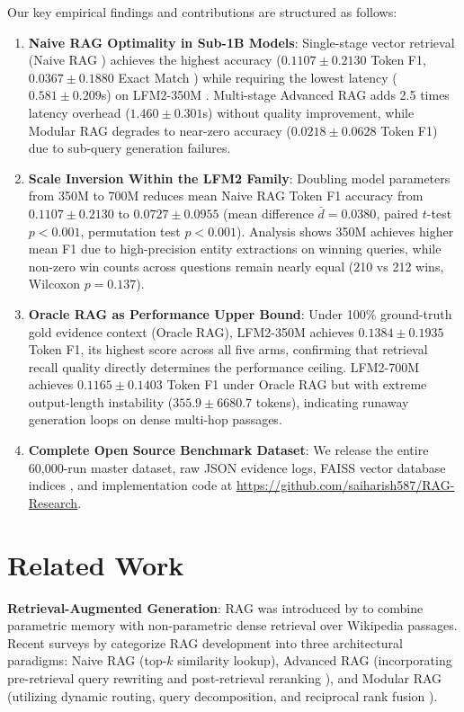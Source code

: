 \documentclass[conference]{IEEEtran}
\begin{document}
Our key empirical findings and contributions are structured as follows:
\begin{enumerate}
    \item \textbf{Naive RAG Optimality in Sub-1B Models}: Single-stage vector retrieval (Naive RAG \cite{lewis2020retrieval}) achieves the highest accuracy ($0.1107 \pm 0.2130$ Token F1, $0.0367 \pm 0.1880$ Exact Match \cite{rajpurkar2016squad}) while requiring the lowest latency ($0.581 \pm 0.209$s) on LFM2-350M \cite{liquid2024lfm}. Multi-stage Advanced RAG adds 2.5 times latency overhead ($1.460 \pm 0.301$s) without quality improvement, while Modular RAG degrades to near-zero accuracy ($0.0218 \pm 0.0628$ Token F1) due to sub-query generation failures.
    \item \textbf{Scale Inversion Within the LFM2 Family}: Doubling model parameters from 350M to 700M reduces mean Naive RAG Token F1 accuracy from $0.1107 \pm 0.2130$ to $0.0727 \pm 0.0955$ (mean difference $\bar{d}=0.0380$, paired $t$-test $p < 0.001$, permutation test $p < 0.001$). Analysis shows 350M achieves higher mean F1 due to high-precision entity extractions on winning queries, while non-zero win counts across questions remain nearly equal (210 vs 212 wins, Wilcoxon $p=0.137$).
    \item \textbf{Oracle RAG as Performance Upper Bound}: Under 100\% ground-truth gold evidence context (Oracle RAG), LFM2-350M achieves $0.1384 \pm 0.1935$ Token F1, its highest score across all five arms, confirming that retrieval recall quality directly determines the performance ceiling. LFM2-700M achieves $0.1165 \pm 0.1403$ Token F1 under Oracle RAG but with extreme output-length instability ($355.9 \pm 6680.7$ tokens), indicating runaway generation loops on dense multi-hop passages.
    \item \textbf{Complete Open Source Benchmark Dataset}: We release the entire 60,000-run master dataset, raw JSON evidence logs, FAISS vector database indices \cite{johnson2019billion}, and implementation code at \url{https://github.com/saiharish587/RAG-Research}.
\end{enumerate}

\section{Related Work}
\label{sec:related}
\textbf{Retrieval-Augmented Generation}: RAG was introduced by \cite{lewis2020retrieval} to combine parametric memory with non-parametric dense retrieval over Wikipedia passages. Recent surveys by \cite{gao2023retrieval} categorize RAG development into three architectural paradigms: Naive RAG (top-$k$ similarity lookup), Advanced RAG (incorporating pre-retrieval query rewriting \cite{ma2023query} and post-retrieval reranking \cite{nogueira2019passage}), and Modular RAG (utilizing dynamic routing, query decomposition, and reciprocal rank fusion \cite{cormack2009reciprocal}).
\end{document}

